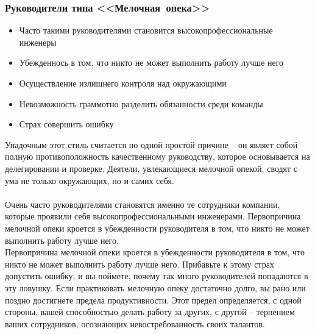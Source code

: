 \documentclass{../industrial-development}
\begin{document}
{\begin{frame} \frametitle{Руководители типа <<Мелочная~опека>>}
\begin{itemize}
		\item Часто такими руководителями становится высокопрофессиональные инженеры
		\item Убежденнось в том, что никто не может выполнить работу лучше него
		\item Осуществление излишнего контроля над окружающими
		\item Невозможность граммотно разделить обязанности среди команды
		\item Страх совершить ошибку
	\end{itemize}
\end{frame}
\lecturenotes
	Упадочным этот стиль считается по одной простой причине – он являет собой полную противоположность качественному руководству, которое основывается на делегировании и проверке. Деятели, увлекающиеся мелочной опекой, сводят с ума не только окружающих, но и самих себя. \\~\\
Очень часто руководителями становятся именно те сотрудники компании, которые проявили себя высокопрофессиональными инженерами. Первопричина мелочной опеки кроется в убежденности руководителя в том, что никто не может выполнить работу лучше него.  \\
Первопричина мелочной опеки кроется в убежденности руководителя в том, что никто не может выполнить работу лучше него. Прибавьте к этому страх допустить ошибку, и вы поймете, почему так много руководителей попадаются в эту ловушку. Если практиковать мелочную опеку достаточно долго, вы рано или поздно достигнете предела продуктивности. Этот предел определяется, с одной стороны, вашей способностью делать работу за других, с другой – терпением ваших сотрудников, осознающих невостребованность своих талантов.




}
\end{document}

